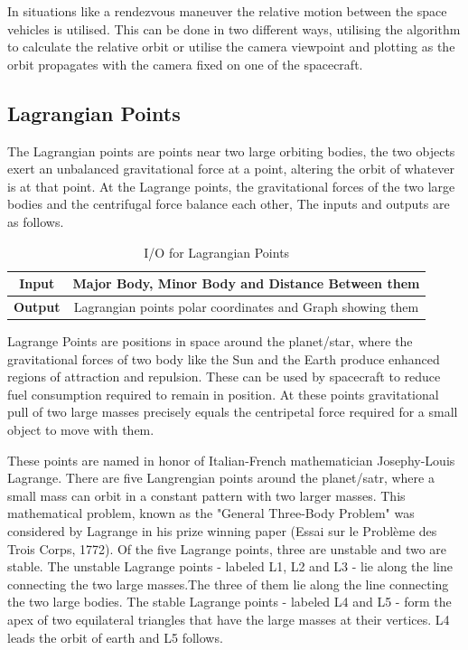 In situations like a rendezvous maneuver the relative motion between the space vehicles is utilised. This can be done in two different ways, utilising the algorithm to calculate the relative orbit or utilise the camera viewpoint and plotting as the orbit propagates with the camera fixed on one of the spacecraft.
\subsection{Lagrangian Points}
The Lagrangian points are points near two large orbiting bodies, the two objects exert an unbalanced gravitational force at a point, altering the orbit of whatever is at that point. At the Lagrange points, the gravitational forces of the two large bodies and the centrifugal force balance each other, The inputs and outputs are as follows.
\begin{table}[H]
\begin{tabular}{@{}cc@{}}
\toprule
\textbf{Input}  & Major Body, Minor Body and Distance Between them           \\ \midrule
\textbf{Output} & Lagrangian points polar coordinates and Graph showing them \\ \bottomrule
\end{tabular}\caption{I/O for Lagrangian Points}
\end{table}
    Lagrange Points are positions in space around the planet/star, where the gravitational forces of two body like the Sun and the Earth produce enhanced regions of attraction and repulsion. These can be used by spacecraft to reduce fuel consumption required to remain in position. At these points gravitational pull of two large masses precisely equals the centripetal force required for a small object to move with them.
    
    These points are named in honor of Italian-French mathematician Josephy-Louis Lagrange. There are five Langrengian points around the planet/satr, where a small mass can orbit in a constant pattern with two larger masses.  This mathematical problem, known as the "General Three-Body Problem" was considered by Lagrange in his prize winning paper (Essai sur le Problème des Trois Corps, 1772).     Of the five Lagrange points, three are unstable and two are stable. The unstable Lagrange points - labeled L1, L2 and L3 - lie along the line connecting the two large masses.The three of them lie along the line connecting the two large bodies.
The stable Lagrange points - labeled L4 and L5 - form the apex of two equilateral triangles that have the large masses at their vertices. L4 leads the orbit of earth and L5 follows.